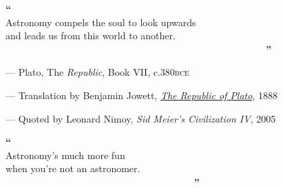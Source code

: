 
\vspace*{2cm}

\begin{center}
    \Huge{\textbf{\textcolor{GOTOlightblue}{``~~~~~~~~~~~~~~~~~~~~~~~~~~~~~~~~~~~~~~~~~~~~~~~}}}\\
    \vspace{-0.8cm}
    \huge{Astronomy compels the soul to look upwards}\\
    \huge{and leads us from this world to another.}\\
    \vspace{-1cm}
    \Huge{\textbf{\textcolor{GOTOlightblue}{~~~~~~~~~~~~~~~~~~~~~~~~~~~~~~~~~~~~~~~~~~~~~~~''}}}\\
\end{center}

\vspace{0.0cm}
\hspace{4cm} --- Plato, The \textit{Republic}, Book VII, c.\@ 380\@ \textsc{bce}

\vspace{0.2cm}
\hspace{4cm} --- Translation by Benjamin Jowett, {\hypersetup{urlcolor=black}\href{http://www.gutenberg.org/files/55201/55201-h/55201-h.htm}{\textit{The Republic of Plato}}}, 1888

\vspace{0.2cm}
\hspace{4cm} --- Quoted by Leonard Nimoy, \textit{Sid Meier's Civilization IV}, 2005


\vspace{3cm}

\begin{center}
    \Huge{\textbf{\textcolor{GOTOlightblue}{``~~~~~~~~~~~~~~~~~~~~~~~~~~~~~~~~~~}}}\\
    \vspace{-0.8cm}
    \huge{Astronomy's much more fun}\\
    \huge{when you're not an astronomer.}\\
    \vspace{-1cm}
    \Huge{\textbf{\textcolor{GOTOlightblue}{~~~~~~~~~~~~~~~~~~~~~~~~~~~~~~~~~~''}}}\\
\end{center}

